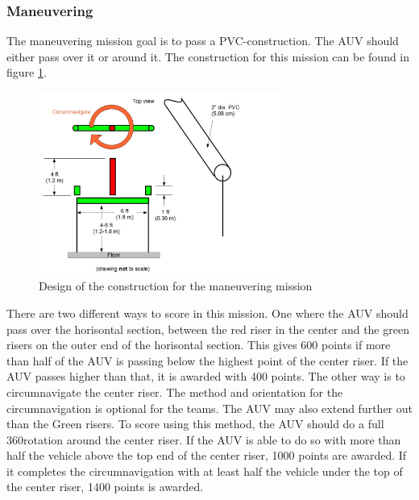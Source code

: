 		\subsubsection{Maneuvering}
\noindent The maneuvering mission goal is to pass a PVC-construction. The AUV should either pass over it or around it. The construction for this mission can be found in figure \ref{maneuvering_mission}.
\begin{figure}[!ht]
	\begin{center}
		\includegraphics[width=80mm]{./Images/Competition/Maneuvering_mission.jpg}
		\caption{Design of the construction for the maneuvering mission}
		\label{maneuvering_mission}
	\end{center}
\end{figure}
There are two different ways to score in this mission. One where the AUV should pass over the horisontal section, between the red riser in the center and the green risers on the outer end of the horisontal section. This gives 600 points if more than half of the AUV is passing below the highest point of the center riser. If the AUV passes higher than that, it is awarded with 400 points. 
The other way is to circumnavigate the center riser. The method and orientation for the circumnavigation is optional for the teams. The AUV may also extend further out than the Green risers. To score using this method, the AUV should do a full 360\degree rotation around the center riser. If the AUV is able to do so with more than half the vehicle above the top end of the center riser, 1000 points are awarded. If it completes the circumnavigation with at least half the vehicle under the top of the center riser, 1400 points is awarded.
